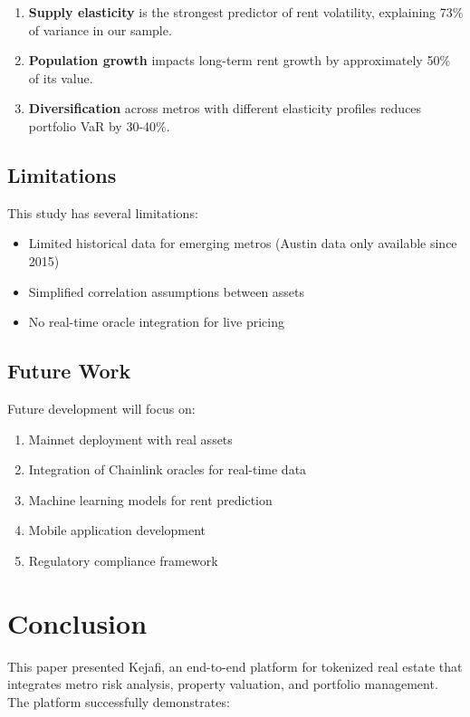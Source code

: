 ﻿\documentclass[12pt]{article}
\begin{document}
\begin{enumerate}
    \item \textbf{Supply elasticity} is the strongest predictor of rent volatility, explaining 73\% of variance in our sample.
    \item \textbf{Population growth} impacts long-term rent growth by approximately 50\% of its value.
    \item \textbf{Diversification} across metros with different elasticity profiles reduces portfolio VaR by 30-40\%.
\end{enumerate}

\subsection{Limitations}

This study has several limitations:
\begin{itemize}
    \item Limited historical data for emerging metros (Austin data only available since 2015)
    \item Simplified correlation assumptions between assets
    \item No real-time oracle integration for live pricing
\end{itemize}

\subsection{Future Work}

Future development will focus on:
\begin{enumerate}
    \item Mainnet deployment with real assets
    \item Integration of Chainlink oracles for real-time data
    \item Machine learning models for rent prediction
    \item Mobile application development
    \item Regulatory compliance framework
\end{enumerate}

\section{Conclusion}

This paper presented Kejafi, an end-to-end platform for tokenized real estate that integrates metro risk analysis, property valuation, and portfolio management. The platform successfully demonstrates:
\end{document}
